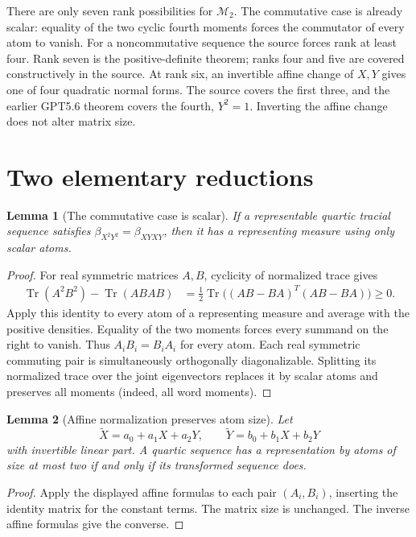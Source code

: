 \documentclass[11pt]{article}
\newtheorem{lemma}{Lemma}
\newcommand{\Tr}{\operatorname{Tr}}
\newcommand{\M}{\mathcal M}
\begin{document}
There are only seven rank possibilities for $\M_2$.  The commutative case is
already scalar: equality of the two cyclic fourth moments forces the
commutator of every atom to vanish.  For a noncommutative sequence the source
forces rank at least four.  Rank seven is the positive-definite theorem;
ranks four and five are covered constructively in the source.  At rank six,
an invertible affine change of $X,Y$ gives one of four quadratic normal forms.
The source covers the first three, and the earlier GPT5.6 theorem covers the
fourth, $Y^2=1$.  Inverting the affine change does not alter matrix size.

\section{Two elementary reductions}

\begin{lemma}[The commutative case is scalar]\label{lem:comm}
If a representable quartic tracial sequence satisfies
$\beta_{X^2Y^2}=\beta_{XYXY}$, then it has a representing measure using only
scalar atoms.
\end{lemma}

\begin{proof}
For real symmetric matrices $A,B$, cyclicity of normalized trace gives
\begin{align*}
 \Tr(A^2B^2)-\Tr(ABAB)
 &=\frac12\Tr\bigl((AB-BA)^T(AB-BA)\bigr)\geq0.
\end{align*}
Apply this identity to every atom of a representing measure and average with
the positive densities.  Equality of the two moments forces every summand on
the right to vanish.  Thus $A_iB_i=B_iA_i$ for every atom.  Each real symmetric
commuting pair is simultaneously orthogonally diagonalizable.  Splitting its
normalized trace over the joint eigenvectors replaces it by scalar atoms and
preserves all moments (indeed, all word moments).
\end{proof}

\begin{lemma}[Affine normalization preserves atom size]\label{lem:affine}
Let
\[
 \widetilde X=a_0+a_1X+a_2Y,\qquad
 \widetilde Y=b_0+b_1X+b_2Y
\]
with invertible linear part.  A quartic sequence has a representation by
atoms of size at most two if and only if its transformed sequence does.
\end{lemma}

\begin{proof}
Apply the displayed affine formulas to each pair $(A_i,B_i)$, inserting the
identity matrix for the constant terms.  The matrix size is unchanged.  The
inverse affine formulas give the converse.
\end{proof}
\end{document}
